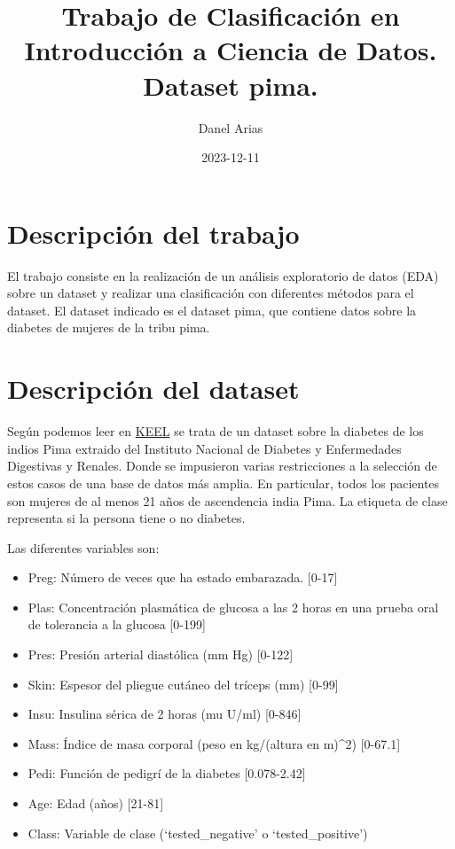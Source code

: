 \documentclass[
]{article}
\title{Trabajo de Clasificación en Introducción a Ciencia de Datos.
Dataset pima.}
\author{Danel Arias}
\date{2023-12-11}
\providecommand{\tightlist}{%
  \setlength{\itemsep}{0pt}\setlength{\parskip}{0pt}}
\begin{document}
\maketitle

\hypertarget{descripciuxf3n-del-trabajo}{%
\section{Descripción del trabajo}\label{descripciuxf3n-del-trabajo}}

El trabajo consiste en la realización de un análisis exploratorio de
datos (EDA) sobre un dataset y realizar una clasificación con diferentes
métodos para el dataset. El dataset indicado es el dataset pima, que
contiene datos sobre la diabetes de mujeres de la tribu pima.

\hypertarget{descripciuxf3n-del-dataset}{%
\section{Descripción del dataset}\label{descripciuxf3n-del-dataset}}

Según podemos leer en
\href{https://sci2s.ugr.es/keel/dataset.php?cod=21}{KEEL} se trata de un
dataset sobre la diabetes de los indios Pima extraido del Instituto
Nacional de Diabetes y Enfermedades Digestivas y Renales. Donde se
impusieron varias restricciones a la selección de estos casos de una
base de datos más amplia. En particular, todos los pacientes son mujeres
de al menos 21 años de ascendencia india Pima. La etiqueta de clase
representa si la persona tiene o no diabetes.

Las diferentes variables son:

\begin{itemize}
\tightlist
\item
  Preg: Número de veces que ha estado embarazada. {[}0-17{]}
\item
  Plas: Concentración plasmática de glucosa a las 2 horas en una prueba
  oral de tolerancia a la glucosa {[}0-199{]}
\item
  Pres: Presión arterial diastólica (mm Hg) {[}0-122{]}
\item
  Skin: Espesor del pliegue cutáneo del tríceps (mm) {[}0-99{]}
\item
  Insu: Insulina sérica de 2 horas (mu U/ml) {[}0-846{]}
\item
  Mass: Índice de masa corporal (peso en kg/(altura en m)\^{}2)
  {[}0-67.1{]}
\item
  Pedi: Función de pedigrí de la diabetes {[}0.078-2.42{]}
\item
  Age: Edad (años) {[}21-81{]}
\item
  Class: Variable de clase (`tested\_negative' o `tested\_positive')
\end{itemize}
\end{document}
